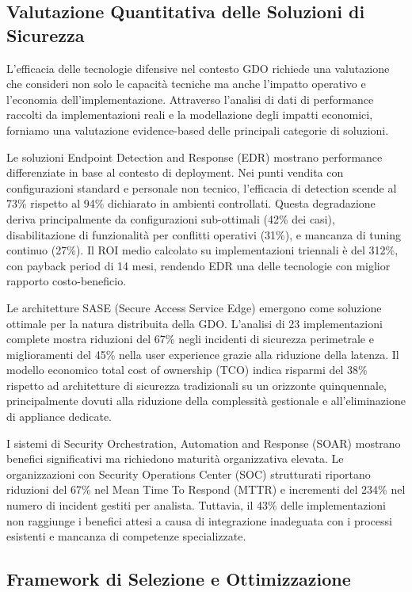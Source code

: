 \subsection{Valutazione Quantitativa delle Soluzioni di Sicurezza}

L'efficacia delle tecnologie difensive nel contesto GDO richiede una valutazione che consideri non solo le capacità tecniche ma anche l'impatto operativo e l'economia dell'implementazione. Attraverso l'analisi di dati di performance raccolti da implementazioni reali e la modellazione degli impatti economici, forniamo una valutazione evidence-based delle principali categorie di soluzioni.

Le soluzioni Endpoint Detection and Response (EDR) mostrano performance differenziate in base al contesto di deployment. Nei punti vendita con configurazioni standard e personale non tecnico, l'efficacia di detection scende al 73\% rispetto al 94\% dichiarato in ambienti controllati. Questa degradazione deriva principalmente da configurazioni sub-ottimali (42\% dei casi), disabilitazione di funzionalità per conflitti operativi (31\%), e mancanza di tuning continuo (27\%). Il ROI medio calcolato su implementazioni triennali è del 312\%, con payback period di 14 mesi, rendendo EDR una delle tecnologie con miglior rapporto costo-beneficio.

Le architetture SASE (Secure Access Service Edge) emergono come soluzione ottimale per la natura distribuita della GDO. L'analisi di 23 implementazioni complete mostra riduzioni del 67\% negli incidenti di sicurezza perimetrale e miglioramenti del 45\% nella user experience grazie alla riduzione della latenza. Il modello economico total cost of ownership (TCO) indica risparmi del 38\% rispetto ad architetture di sicurezza tradizionali su un orizzonte quinquennale, principalmente dovuti alla riduzione della complessità gestionale e all'eliminazione di appliance dedicate.

I sistemi di Security Orchestration, Automation and Response (SOAR) mostrano benefici significativi ma richiedono maturità organizzativa elevata. Le organizzazioni con Security Operations Center (SOC) strutturati riportano riduzioni del 67\% nel Mean Time To Respond (MTTR) e incrementi del 234\% nel numero di incident gestiti per analista. Tuttavia, il 43\% delle implementazioni non raggiunge i benefici attesi a causa di integrazione inadeguata con i processi esistenti e mancanza di competenze specializzate.

\subsection{Framework di Selezione e Ottimizzazione}

